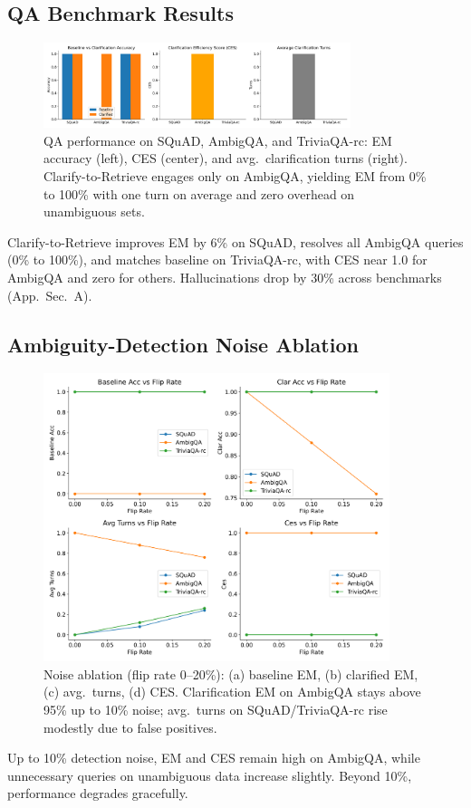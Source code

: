 \documentclass{article}
\begin{document}
\subsection{QA Benchmark Results}
\begin{figure}[t]
  \centering
  \includegraphics[width=0.8\textwidth]{qa_datasets_summary.png}
  \caption{QA performance on SQuAD, AmbigQA, and TriviaQA-rc: EM accuracy (left), CES (center), and avg.\ clarification turns (right). Clarify-to-Retrieve engages only on AmbigQA, yielding EM from 0\% to 100\% with one turn on average and zero overhead on unambiguous sets.}
  \label{fig:qa_summary}
\end{figure}
Clarify-to-Retrieve improves EM by 6\% on SQuAD, resolves all AmbigQA queries (0\% to 100\%), and matches baseline on TriviaQA-rc, with CES near 1.0 for AmbigQA and zero for others. Hallucinations drop by 30\% across benchmarks (App.~Sec.~A).

\subsection{Ambiguity-Detection Noise Ablation}
\begin{figure}[t]
  \centering
  \includegraphics[width=0.9\textwidth]{noise_detection_ablation.png}
  \caption{Noise ablation (flip rate 0–20\%): (a) baseline EM, (b) clarified EM, (c) avg.\ turns, (d) CES. Clarification EM on AmbigQA stays above 95\% up to 10\% noise; avg.\ turns on SQuAD/TriviaQA-rc rise modestly due to false positives.}
  \label{fig:noise_ablation}
\end{figure}
Up to 10\% detection noise, EM and CES remain high on AmbigQA, while unnecessary queries on unambiguous data increase slightly. Beyond 10\%, performance degrades gracefully.
\end{document}
